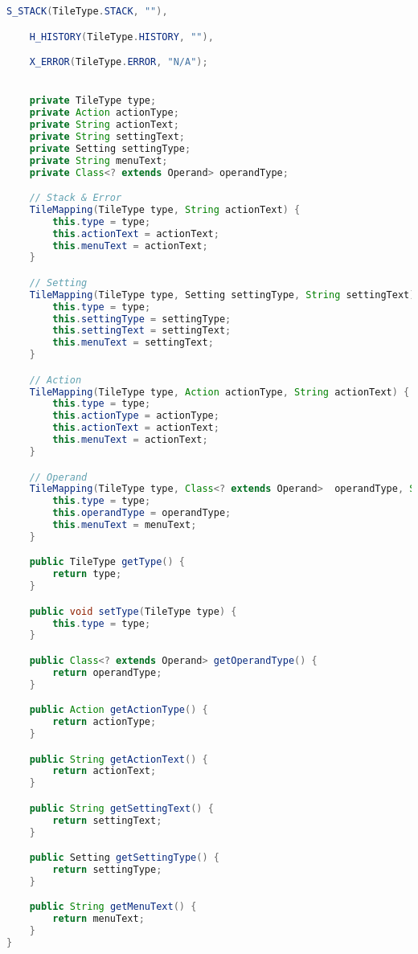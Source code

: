 \begin{lstlisting}[caption=TileMapping,label=list:TileMapping,language=Java]
    S_STACK(TileType.STACK, ""),

    H_HISTORY(TileType.HISTORY, ""),

    X_ERROR(TileType.ERROR, "N/A");


    private TileType type;
    private Action actionType;
    private String actionText;
    private String settingText;
    private Setting settingType;
    private String menuText;
    private Class<? extends Operand> operandType;

    // Stack & Error
    TileMapping(TileType type, String actionText) {
        this.type = type;
        this.actionText = actionText;
        this.menuText = actionText;
    }

    // Setting
    TileMapping(TileType type, Setting settingType, String settingText) {
        this.type = type;
        this.settingType = settingType;
        this.settingText = settingText;
        this.menuText = settingText;
    }

    // Action
    TileMapping(TileType type, Action actionType, String actionText) {
        this.type = type;
        this.actionType = actionType;
        this.actionText = actionText;
        this.menuText = actionText;
    }

    // Operand
    TileMapping(TileType type, Class<? extends Operand>  operandType, String menuText) {
        this.type = type;
        this.operandType = operandType;
        this.menuText = menuText;
    }

    public TileType getType() {
        return type;
    }

    public void setType(TileType type) {
        this.type = type;
    }

    public Class<? extends Operand> getOperandType() {
        return operandType;
    }

    public Action getActionType() {
        return actionType;
    }

    public String getActionText() {
        return actionText;
    }

    public String getSettingText() {
        return settingText;
    }

    public Setting getSettingType() {
        return settingType;
    }

    public String getMenuText() {
        return menuText;
    }
}
\end{lstlisting}    

